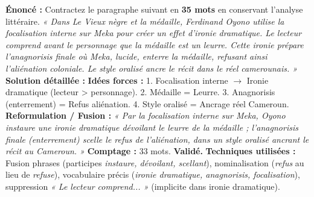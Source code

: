 \documentclass[11pt]{article}
\begin{document}
\begin{exoresolu}
    \textbf{Énoncé :} Contractez le paragraphe suivant en \textbf{35 mots} en conservant l'analyse littéraire.
    \medskip
    \emph{« Dans Le Vieux nègre et la médaille, Ferdinand Oyono utilise la focalisation interne sur Meka pour créer un effet d'ironie dramatique. Le lecteur comprend avant le personnage que la médaille est un leurre. Cette ironie prépare l'anagnorisis finale où Meka, lucide, enterre la médaille, refusant ainsi l'aliénation coloniale. Le style oralisé ancre le récit dans le réel camerounais. »}
    \tcblower
    \textbf{Solution détaillée :}
    \textbf{Idées forces :}
    1. Focalisation interne $\rightarrow$ Ironie dramatique (lecteur > personnage).
    2. Médaille = Leurre.
    3. Anagnorisis (enterrement) = Refus aliénation.
    4. Style oralisé = Ancrage réel Cameroun.
    \textbf{Reformulation / Fusion :}
    \emph{« Par la focalisation interne sur Meka, Oyono instaure une ironie dramatique dévoilant le leurre de la médaille ; l'anagnorisis finale (enterrement) scelle le refus de l'aliénation, dans un style oralisé ancrant le récit au Cameroun. »}
    \textbf{Comptage :} 33 mots. \textbf{Validé.}
    \textbf{Techniques utilisées :} Fusion phrases (participes \emph{instaure, dévoilant, scellant}), nominalisation (\emph{refus} au lieu de \emph{refuse}), vocabulaire précis (\emph{ironie dramatique, anagnorisis, focalisation}), suppression \emph{« Le lecteur comprend... »} (implicite dans ironie dramatique).
\end{exoresolu}
\end{document}
